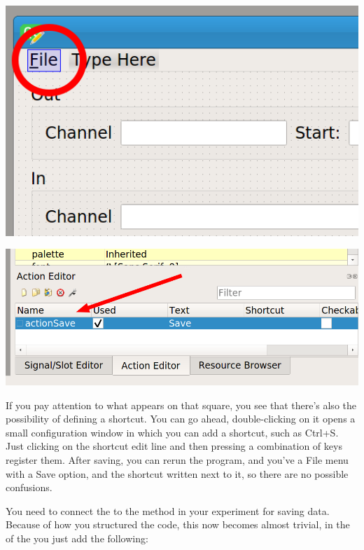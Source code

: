 \begin{minipage}{0.45\linewidth}
    \centering
    \includegraphics[width=\textwidth]{images/Chapter_09/13_menu_file.png}
\end{minipage}
\hspace{0.5cm}
\begin{minipage}{0.45\linewidth}
    \centering
    \includegraphics[width=\textwidth]{images/Chapter_09/13_action_save.png}
\end{minipage}

If you pay attention to what appears on that square, you see that there's also the possibility of defining a shortcut. You can go ahead, double-clicking on it opens a small configuration window in which you can add a shortcut, such as Ctrl+S. Just clicking on the shortcut edit line and then pressing a combination of keys register them. After saving, you can rerun the program, and you've a File menu with a Save option, and the shortcut written next to it, so there are no possible confusions.

You need to connect the  to the method in your experiment for saving data. Because of how you structured the code, this now becomes almost trivial, in the  of the  you just add the following:

